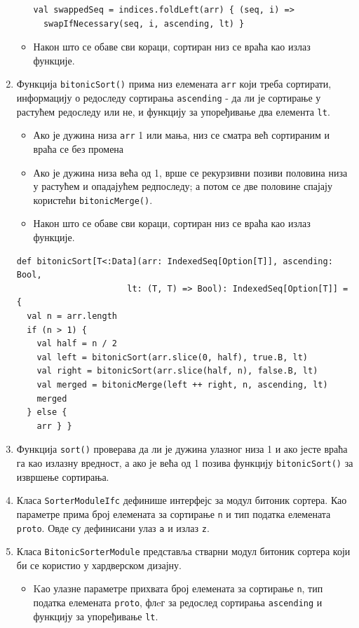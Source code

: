 \documentclass[12pt, a4paper]{article}
\theoremstyle{definition}
\begin{document}
\begin{enumerate}
\begin{itemize}
\begin{verbatim}
val swappedSeq = indices.foldLeft(arr) { (seq, i) =>
  swapIfNecessary(seq, i, ascending, lt) }
\end{verbatim}
\item Након што се обаве сви кораци, сортиран низ се враћа као излаз функције.
\end{itemize}
\item Функција \verb+bitonicSort()+ прима низ елемената \verb+arr+ који треба сортирати, информацију о редоследу сортирања \verb+ascending+ - да ли је сортирање у растућем редоследу или не, и функцију за упоређивање два елемента \verb+lt+.
\begin{itemize}
 \item Ако је дужина низа \verb+arr+ 1 или мања, низ се сматра већ сортираним и враћа се без промена
 \item Ако је дужина низа већа од 1, врше се рекурзивни позиви половина низа у растућем и опадајућем редпоследу; а потом се две половине спајају користећи \verb+bitonicMerge()+.
 \item Након што се обаве сви кораци, сортиран низ се враћа као излаз функције.
\end{itemize}
\begin{verbatim}
def bitonicSort[T<:Data](arr: IndexedSeq[Option[T]], ascending: Bool,
                      lt: (T, T) => Bool): IndexedSeq[Option[T]] = {
  val n = arr.length
  if (n > 1) {
    val half = n / 2
    val left = bitonicSort(arr.slice(0, half), true.B, lt)
    val right = bitonicSort(arr.slice(half, n), false.B, lt)
    val merged = bitonicMerge(left ++ right, n, ascending, lt)
    merged
  } else {
    arr } }
\end{verbatim}
\item Функција \verb+sort()+ проверава да ли је дужина улазног низа 1 и ако јесте враћа га као излазну вредност, а ако је већа од 1 позива функцију \verb+bitonicSort()+ за извршење сортирања.
\item  Класа \verb+SorterModuleIfc+ дефинише интерфејс за модул битоник сортера. Као параметре прима број елемената за сортирање \verb+n+ и тип податка елемената \verb+proto+. Овде су дефинисани улаз \verb+a+ и излаз \verb+z+.
\item Класа \verb+BitonicSorterModule+ представља стварни модул битоник сортера који би се користио у хардверском дизајну.
\begin{itemize}
 \item Kао улазне параметре прихвата број елемената за сортирање \verb+n+, тип податка елемената \verb+proto+, флeг за редослед сортирања \verb+ascending+ и функцију за упоређивање \verb+lt+.

\end{itemize}
\end{enumerate}
\end{document}
